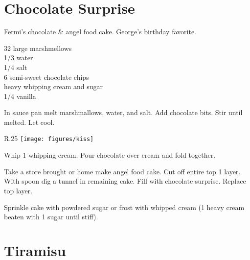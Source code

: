 \section{Chocolate Surprise}

\begin{open}
  Fermi's chocolate \& angel food cake.  George's birthday favorite.
\end{open}
\begin{ingredients}
  32 large marshmellows\\
  \SI{1/3}{\cup} water\\
  \SI{1/4}{\teaspoon} salt\\
  \SI{6}{\ounce} semi-sweet chocolate chips\\
  heavy whipping cream and sugar\\
  \SI{1/4}{\teaspoon} vanilla
\end{ingredients}
In sauce pan melt marshmallows, water, and salt.  Add chocolate bits.  Stir
until melted.  Let cool.

\begin{wrapfigure}{R}{.25\textwidth}
\centering\texttt{[image: figures/kiss]}
\end{wrapfigure}

Whip \SI{1}{\cup} whipping cream.  Pour chocolate over cream and fold
together.

Take a store brought or home make angel food cake.  Cut off entire top
\SI{1}{\inch} layer.  With spoon dig a tunnel in remaining cake.  Fill with
chocolate surprise.  Replace top layer.

Sprinkle cake with powdered sugar or frost with whipped cream (\SI{1}{\cup}
heavy cream beaten with \SI{1}{\tblspoon} sugar until stiff).

\section{Tiramisu}

